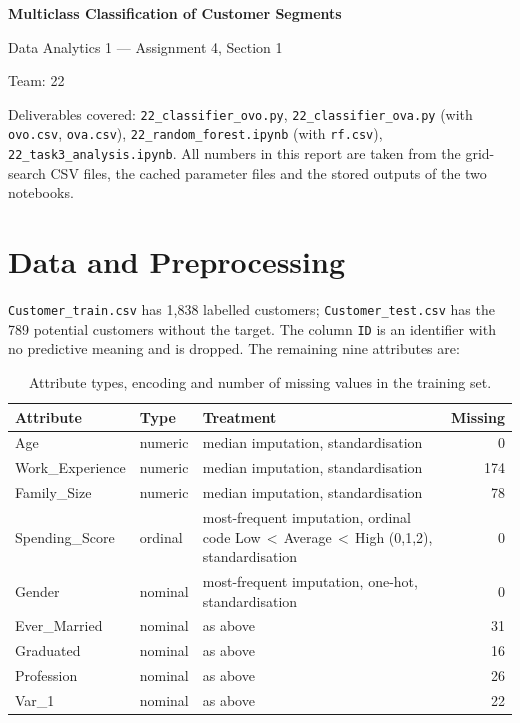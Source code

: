 \documentclass[11pt]{article}
\begin{document}
\begin{titlepage}
\centering\vspace*{4cm}
{\LARGE\bfseries Multiclass Classification of Customer Segments\par}\vspace{0.6cm}
{\large Data Analytics 1 --- Assignment 4, Section 1\par}\vspace{0.4cm}
{\large Team: 22\par}\vspace{1.5cm}
\begin{minipage}{0.8\textwidth}\small\raggedright
Deliverables covered: \texttt{22\_classifier\_ovo.py}, \texttt{22\_classifier\_ova.py}
(with \texttt{ovo.csv}, \texttt{ova.csv}), \texttt{22\_random\_forest.ipynb} (with \texttt{rf.csv}),
\texttt{22\_task3\_analysis.ipynb}.
All numbers in this report are taken from the grid-search CSV files, the cached parameter files and
the stored outputs of the two notebooks.
\end{minipage}
\end{titlepage}
\tableofcontents
\newpage

\section{Data and Preprocessing}
\texttt{Customer\_train.csv} has 1{,}838 labelled customers; \texttt{Customer\_test.csv} has the
789 potential customers without the target. The column \texttt{ID} is an identifier with no
predictive meaning and is dropped. The remaining nine attributes are:

\begin{table}[H]\centering\small
\caption{Attribute types, encoding and number of missing values in the training set.}\label{tab:attrs}
\begin{tabular}{@{}llp{6.2cm}r@{}}
\toprule
Attribute & Type & Treatment & Missing \\
\midrule
Age & numeric & median imputation, standardisation & 0 \\
Work\_Experience & numeric & median imputation, standardisation & 174 \\
Family\_Size & numeric & median imputation, standardisation & 78 \\
Spending\_Score & ordinal & most-frequent imputation, ordinal code Low\,$<$\,Average\,$<$\,High (0,1,2), standardisation & 0 \\
Gender & nominal & most-frequent imputation, one-hot, standardisation & 0 \\
Ever\_Married & nominal & as above & 31 \\
Graduated & nominal & as above & 16 \\
Profession & nominal & as above & 26 \\
Var\_1 & nominal & as above & 22 \\
\bottomrule
\end{tabular}
\end{table}
\end{document}
